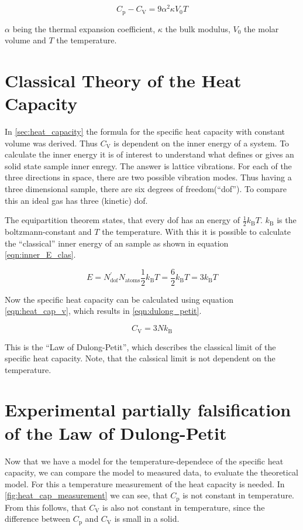 \begin{equation}
    \label{eqn:p_v_correction}
    C_\mathrm{p} - C_\mathrm{V} = 9\alpha^2\kappa V_0T
\end{equation}

$\alpha$ being the thermal expansion coefficient, $\kappa$ the bulk modulus, $V_0$ the molar volume and $T$ the temperature.

\section{Classical Theory of the Heat Capacity}
\label{sec:classical}
In \autoref{sec:heat_capacity} the formula for the specific heat capacity with constant volume was derived. Thus $C_\mathrm{V}$ is dependent on the inner energy of a system. To 
calculate the inner energy it is of interest to understand what defines or gives an solid state sample inner enregy. The answer is lattice vibrations. For each of the three directions
in space, there are two possible vibration modes. Thus having a three dimensional sample, there are six degrees of freedom(\enquote{dof}). To compare this an ideal gas has three (kinetic)
dof.

The equipartition theorem states, that every
dof has an energy of $\frac{1}{2}k_\mathrm{B}T$. $k_\mathrm{B}$ is the boltzmann-constant and $T$ the temperature. With this it is possible to calculate the \enquote{classical} inner
energy of an sample as shown in equation \ref{eqn:inner_E_clas}.

\begin{equation}
    \label{eqn:inner_E_clas}
    E = N_{\mathrm{dof}}^{'} N_{\mathrm{atoms}} \frac{1}{2}k_\mathrm{B}T = \frac{6}{2}k_\mathrm{B}T = 3k_\mathrm{B}T
\end{equation}

Now the specific heat capacity can be calculated using equation \ref{eqn:heat_cap_v}, which results in \ref{eqn:dulong_petit}.

\begin{equation}
    \label{eqn:dulong_petit}
    C_\mathrm{V} = 3Nk_\mathrm{B}
\end{equation}

This is the \enquote{Law of Dulong-Petit}, which describes the classical limit of the specific heat capacity. Note, that the calssical limit is not dependent on the temperature.

\section{Experimental partially falsification of the Law of Dulong-Petit}
\label{sec:ueberleitung}
Now that we have a model for the temperature-dependece of the specific heat capacity, we can compare the model to measured data, to evaluate the theoretical model. For this a temperature
measurement of the heat capacity is needed. In \autoref{fig:heat_cap_measurement} we can see, that $C_\mathrm{p}$ is not constant in temperature. From this follows, that $C_\mathrm{V}$
is also not constant in temperature, since the difference between $C_\mathrm{p}$ and $C_\mathrm{V}$ is small in a solid.

